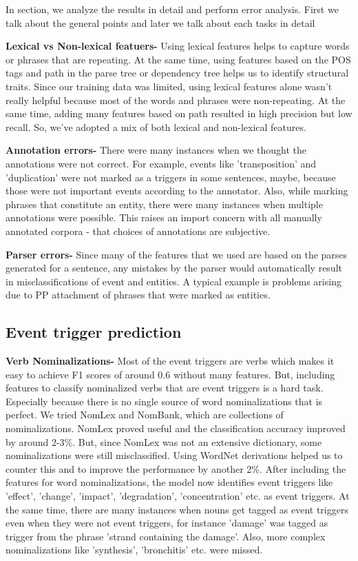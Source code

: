 In section, we analyze the results in detail and perform error analysis. First we talk about the general points and later we talk about each tasks in detail

{\bf Lexical vs Non-lexical featuers-} Using lexical features helps to capture words or phrases that are repeating. At the same time, using features based on the POS tags and path in the parse tree or dependency tree helps us to identify structural traits. Since our training data was limited, using lexical features alone wasn't really helpful because most of the words and phrases were non-repeating. At the same time, adding many features based on path resulted in high precision but low recall. So, we've adopted a mix of both lexical and non-lexical features.

{\bf Annotation errors-} There were many instances when we thought the annotations were not correct. For example, events like 'transposition' and 'duplication' were not marked as a triggers in some sentences, maybe, because those were not important events according to the annotator. Also, while marking phrases that constitute an entity, there were many instances when multiple annotations were possible. This raises an import concern with all manually annotated corpora - that choices of annotations are subjective.

{\bf Parser errors-} Since many of the features that we used are based on the parses generated for a sentence, any mistakes by the parser would automatically result in misclassifications of event and entities. A typical example is problems arising due to PP attachment of phrases that were marked as entities.

\subsection{Event trigger prediction}
{\bf Verb Nominalizations-} Most of the event triggers are verbs which makes it easy to achieve F1 scores of around 0.6 without many features. But, including features to classify nominalized verbs that are event triggers is a hard task. Especially because there is no single source of word nominalizations that is perfect. We tried NomLex and NomBank, which are collections of nominalizations. NomLex proved useful and the classification accuracy improved by around 2-3\%. But, since NomLex was not an extensive dictionary, some nominalizations were still misclassified. Using WordNet derivations helped us to counter this and to improve the performance by another 2\%. After including the features for word nominalizations, the model now identifies event triggers like 'effect', 'change', 'impact', 'degradation', 'concentration' etc. as event triggers. At the same time, there are many instances when nouns get tagged as event triggers even when they were not event triggers, for instance 'damage' was tagged as trigger from the phrase 'strand containing the damage'. Also, more complex nominalizations like 'synthesis', 'bronchitis' etc. were missed.

